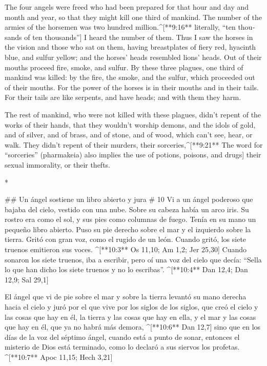 \begin{paracols}{2}
\begin{english}
 The four angels were freed who had been prepared for that hour and day and month and year, so that they might kill one third of mankind.  The number of the armies of the horsemen was two hundred million.^[**9:16** literally, “ten thousands of ten thousands”] I heard the number of them.  Thus I saw the horses in the vision and those who sat on them, having breastplates of fiery red, hyacinth blue, and sulfur yellow; and the horses’ heads resembled lions’ heads. Out of their mouths proceed fire, smoke, and sulfur.  By these three plagues, one third of mankind was killed: by the fire, the smoke, and the sulfur, which proceeded out of their mouths.  For the power of the horses is in their mouths and in their tails. For their tails are like serpents, and have heads; and with them they harm. 

 The rest of mankind, who were not killed with these plagues, didn’t repent of the works of their hands, that they wouldn’t worship demons, and the idols of gold, and of silver, and of brass, and of stone, and of wood, which can’t see, hear, or walk.  They didn’t repent of their murders, their sorceries,^[**9:21** The word for “sorceries” (pharmakeia) also implies the use of potions, poisons, and drugs] their sexual immorality, or their thefts.

\end{english}
\switchcolumn[0]*

## Un ángel sostiene un libro abierto y jura
# 10
 Vi a un ángel poderoso que bajaba del cielo, vestido con una nube. Sobre su cabeza había un arco iris. Su rostro era como el sol, y sus pies como columnas de fuego.  Tenía en su mano un pequeño libro abierto. Puso su pie derecho sobre el mar y el izquierdo sobre la tierra.  Gritó con gran voz, como el rugido de un león. Cuando gritó, los siete truenos emitieron sus voces. ^[**10:3** Os 11,10; Am 1,2; Jer 25,30]  Cuando sonaron los siete truenos, iba a escribir, pero oí una voz del cielo que decía: “Sella lo que han dicho los siete truenos y no lo escribas”. ^[**10:4** Dan 12,4; Dan 12,9; Sal 29,1]

 El ángel que vi de pie sobre el mar y sobre la tierra levantó su mano derecha hacia el cielo  y juró por el que vive por los siglos de los siglos, que creó el cielo y las cosas que hay en él, la tierra y las cosas que hay en ella, y el mar y las cosas que hay en él, que ya no habrá más demora, ^[**10:6** Dan 12,7]  sino que en los días de la voz del séptimo ángel, cuando está a punto de sonar, entonces el misterio de Dios está terminado, como lo declaró a sus siervos los profetas. ^[**10:7** Apoc 11,15; Hech 3,21]


\end{paracols}
